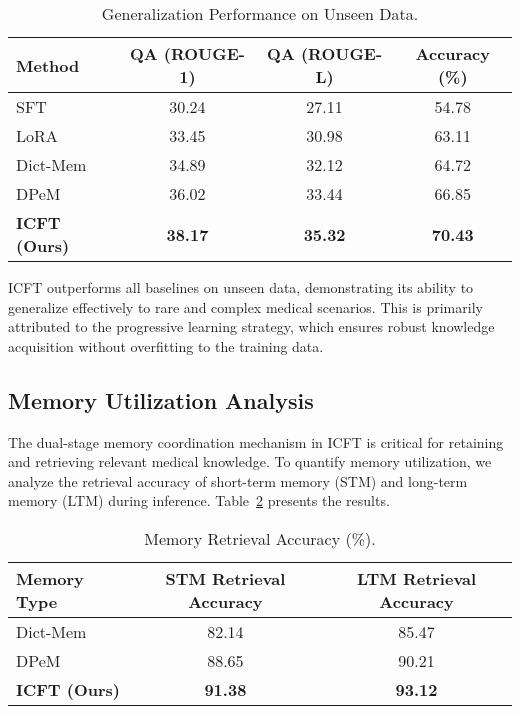 \begin{table}[ht]
\centering
\caption{Generalization Performance on Unseen Data.}
\label{tab:generalization}
\begin{tabular}{lccc}
\toprule
\textbf{Method} & \textbf{QA (ROUGE-1)} & \textbf{QA (ROUGE-L)} & \textbf{Accuracy (\%)} \\
\midrule
SFT               & 30.24 & 27.11 & 54.78 \\
LoRA              & 33.45 & 30.98 & 63.11 \\
Dict-Mem          & 34.89 & 32.12 & 64.72 \\
DPeM              & 36.02 & 33.44 & 66.85 \\
\textbf{ICFT (Ours)} & \textbf{38.17} & \textbf{35.32} & \textbf{70.43} \\
\bottomrule
\end{tabular}
\end{table}

ICFT outperforms all baselines on unseen data, demonstrating its ability to generalize effectively to rare and complex medical scenarios. This is primarily attributed to the progressive learning strategy, which ensures robust knowledge acquisition without overfitting to the training data.

\subsection{Memory Utilization Analysis}

The dual-stage memory coordination mechanism in ICFT is critical for retaining and retrieving relevant medical knowledge. To quantify memory utilization, we analyze the retrieval accuracy of short-term memory (STM) and long-term memory (LTM) during inference. Table~\ref{tab:memory_utilization} presents the results.

\begin{table}[ht]
\centering
\caption{Memory Retrieval Accuracy (\%).}
\label{tab:memory_utilization}
\begin{tabular}{lcc}
\toprule
\textbf{Memory Type} & \textbf{STM Retrieval Accuracy} & \textbf{LTM Retrieval Accuracy} \\
\midrule
Dict-Mem          & 82.14 & 85.47 \\
DPeM              & 88.65 & 90.21 \\
\textbf{ICFT (Ours)} & \textbf{91.38} & \textbf{93.12} \\
\bottomrule
\end{tabular}
\end{table}

